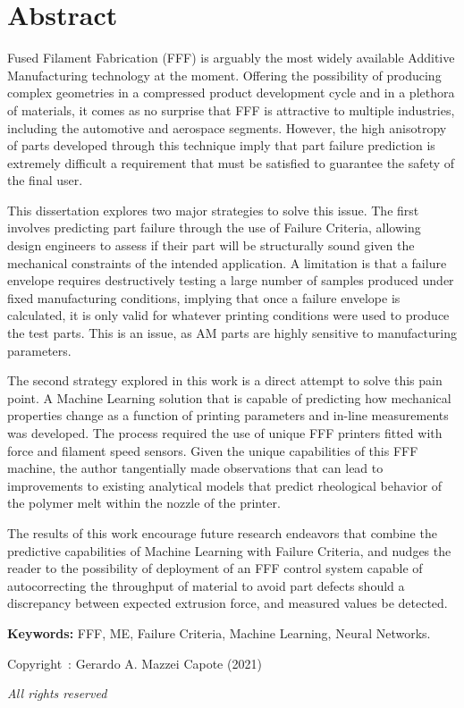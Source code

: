 \documentclass[main.tex]{subfiles}
\begin{document}
\setcounter{page}{1}
\chapter*{Abstract}%
Fused Filament Fabrication (FFF) is arguably the most widely available Additive Manufacturing technology at the moment. Offering the possibility of producing complex geometries in a compressed product development cycle and in a plethora of materials, it comes as no surprise that FFF is attractive to multiple industries, including the automotive and aerospace segments. However, the high anisotropy of parts developed through this technique imply that part failure prediction is extremely difficult \textemdash a requirement that must be satisfied to guarantee the safety of the final user.

This dissertation explores two major strategies to solve this issue. The first involves predicting part failure through the use of Failure Criteria, allowing design engineers to assess if their part will be structurally sound given the mechanical constraints of the intended application. A limitation is that a failure envelope requires destructively testing a large number of samples produced under fixed manufacturing conditions, implying that once a failure envelope is calculated, it is only valid for whatever printing conditions were used to produce the test parts. This is an issue, as AM parts are highly sensitive to manufacturing parameters. 

The second strategy explored in this work is a direct attempt to solve this pain point. A Machine Learning solution that is capable of predicting how mechanical properties change as a function of printing parameters and in-line measurements was developed. The process required the use of unique FFF printers fitted with force and filament speed sensors. Given the unique capabilities of this FFF machine, the author tangentially made observations that can lead to improvements to existing analytical models that predict rheological behavior of the polymer melt within the nozzle of the printer. 

The results of this work encourage future research endeavors that combine the predictive capabilities of Machine Learning with Failure Criteria, and nudges the reader to the possibility of deployment of an FFF control system capable of autocorrecting the throughput of material to avoid part defects should a discrepancy between expected extrusion force, and measured values be detected.  
 
\vspace{10mm} %
\textbf{Keywords:} FFF, ME, Failure Criteria, Machine Learning, Neural Networks.

\vfill %
\begin{center}
Copyright~\textcopyright: Gerardo A. Mazzei Capote (2021)

\emph{All rights reserved}	
\end{center}
\end{document}

